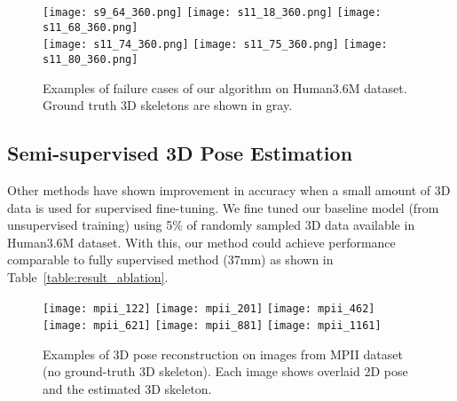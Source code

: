 \documentclass[10pt,twocolumn,letterpaper]{article}
\begin{document}
\begin{figure}[h!]\centering
\texttt{[image: s9\_64\_360.png]}
	\texttt{[image: s11\_18\_360.png]}
	\texttt{[image: s11\_68\_360.png]}\\
	\texttt{[image: s11\_74\_360.png]}
	\texttt{[image: s11\_75\_360.png]}
	\texttt{[image: s11\_80\_360.png]}
	\caption{Examples of failure cases of our algorithm on Human3.6M dataset. Ground truth 3D skeletons are shown in gray.}
	\label{fig:h3failure}
\vspace{-3ex}
\end{figure}


\subsection{Semi-supervised 3D Pose Estimation}
Other methods have shown improvement in accuracy when a small amount of 3D data is used for supervised fine-tuning. We fine tuned our baseline model (from unsupervised training) using 5\% of randomly sampled 3D data available in Human3.6M dataset. With this, our method could achieve performance comparable to fully supervised method (37mm) as shown in Table~\ref{table:result_ablation}. 







\begin{figure}[htb!]
	\centering






\texttt{[image: mpii\_122]}
	\texttt{[image: mpii\_201]}
\texttt{[image: mpii\_462]}\\
	\texttt{[image: mpii\_621]}
\texttt{[image: mpii\_881]}
\texttt{[image: mpii\_1161]}\\


	\caption{Examples of 3D pose reconstruction on images from MPII dataset (no ground-truth 3D skeleton). Each image shows overlaid 2D pose and the estimated 3D skeleton.}
	\vspace{-1ex}
	\label{fig:mpii}
\end{figure}
\end{document}
